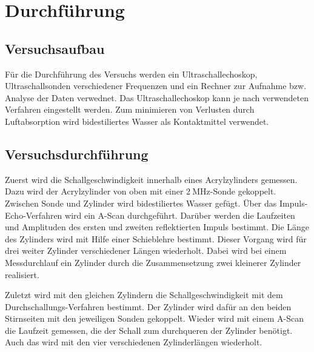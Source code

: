 \section{Durchführung}
\label{sec:Durchführung}

\subsection{Versuchsaufbau}
Für die Durchführung des Versuchs werden ein Ultraschallechoskop, Ultraschallsonden verschiedener Frequenzen und ein Rechner zur Aufnahme bzw. Analyse der Daten verwednet. Das Ultraschallechoskop kann je nach verwendeten Verfahren eingestellt werden. Zum minimieren von Verlusten durch Luftabsorption wird bidestiliertes Wasser als Kontaktmittel verwendet.

\subsection{Versuchsdurchführung}
Zuerst wird die Schallgeschwindigkeit innerhalb eines Acrylzylinders gemessen. Dazu wird der Acrylzylinder von oben mit einer $\SI{2}{\mega\hertz}$-Sonde gekoppelt. Zwischen Sonde und Zylinder wird bidestiliertes Wasser gefügt. Über das Impuls-Echo-Verfahren wird ein A-Scan durchgeführt. Darüber werden die Laufzeiten und Amplituden des ersten und zweiten reflektierten Impuls bestimmt. Die Länge des Zylinders wird mit Hilfe einer Schieblehre bestimmt. Dieser Vorgang wird für drei weiter Zylinder verschiedener Längen wiederholt. Dabei wird bei einem Messdurchlauf ein Zylinder durch die Zusammensetzung zwei kleinerer Zylinder realisiert. 

Zuletzt wird mit den gleichen Zylindern die Schallgeschwindigkeit mit dem Durchschallungs-Verfahren bestimmt. Der Zylinder wird dafür an den beiden Stirnseiten mit den jeweiligen Sonden gekoppelt. Wieder wird mit einem A-Scan die Laufzeit gemessen, die der Schall zum durchqueren der Zylinder benötigt. Auch das wird mit den vier verschiedenen Zylinderlängen wiederholt.


